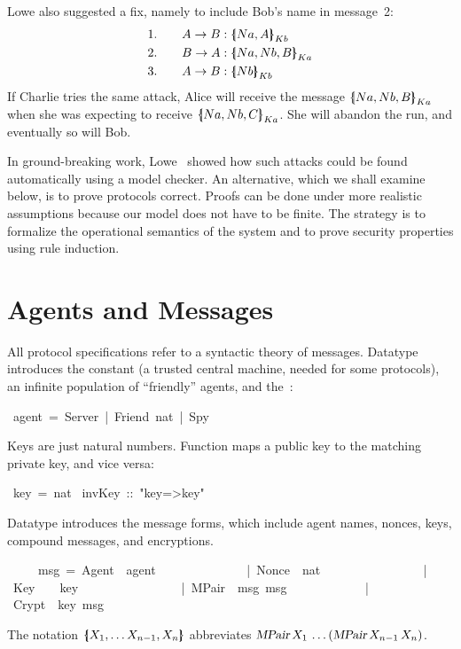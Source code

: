 Lowe also suggested a fix, namely to include Bob's name in message~2:
\begin{alignat*}{2}
  &1.&\quad  A\to B  &: \mathopen{\{\kern-.30em|} Na,A\mathclose{|\kern-.32em\}}\sb{Kb} \\
  &2.&\quad  B\to A  &: \mathopen{\{\kern-.30em|} Na,Nb,B\mathclose{|\kern-.32em\}}\sb{Ka} \\
  &3.&\quad  A\to B  &: \mathopen{\{\kern-.30em|} Nb\mathclose{|\kern-.32em\}}\sb{Kb}
\end{alignat*}
If Charlie tries the same attack, Alice will receive the message
$\mathopen{\{\kern-.30em|} Na,Nb,B\mathclose{|\kern-.32em\}}\sb{Ka}$ when she was expecting to receive
$\mathopen{\{\kern-.30em|} Na,Nb,C\mathclose{|\kern-.32em\}}\sb{Ka}$.  She will abandon the run, and eventually so
will Bob.

In ground-breaking work, Lowe~\cite{lowe-fdr} showed how such attacks
could be found automatically using a model checker.  An alternative,
which we shall examine below, is to prove protocols correct.  Proofs
can be done under more realistic assumptions because our model does
not have to be finite.  The strategy is to formalize the operational
semantics of the system and to prove security properties using rule
induction.


\section{Agents and Messages}

All protocol specifications refer to a syntactic theory of messages. 
Datatype
 introduces the constant  (a trusted central
machine, needed for some protocols), an infinite population of ``friendly''
agents, and the~:
\begin{isabelle}
\ agent\ =\ Server\ |\ Friend\ nat\ |\ Spy
\end{isabelle}
%
Keys are just natural numbers.  Function  maps a public key to
the matching private key, and vice versa:
\begin{isabelle}
\ key\ =\ nat\isanewline
{}\ invKey\ ::\ "key=>key"
\end{isabelle}
Datatype
 introduces the message forms, which include agent names, nonces,
keys, compound messages, and encryptions.  
\begin{isabelle}
\isanewline
\ \ \ \ \ msg\ =\ Agent\ \ agent\ \ \ \ \ \isanewline
\ \ \ \ \ \ \ \ \ |\ Nonce\ \ nat\ \ \ \ \ \ \ \isanewline
\ \ \ \ \ \ \ \ \ |\ Key\ \ \ \ key\ \ \ \ \ \ \ \isanewline
\ \ \ \ \ \ \ \ \ |\ MPair\ \ msg\ msg\ \ \ \isanewline
\ \ \ \ \ \ \ \ \ |\ Crypt\ \ key\ msg\ \ \ \isanewline
\end{isabelle}
%
The notation $\mathopen{\{\kern-.30em|} X\sb 1,\ldots X\sb{n-1},X\sb n\mathclose{|\kern-.32em\}}$
abbreviates
$\emph{\sl MPair}\,X\sb 1\,\ldots\allowbreak(\emph{\sl MPair}\,X\sb{n-1}\,X\sb n)$.

